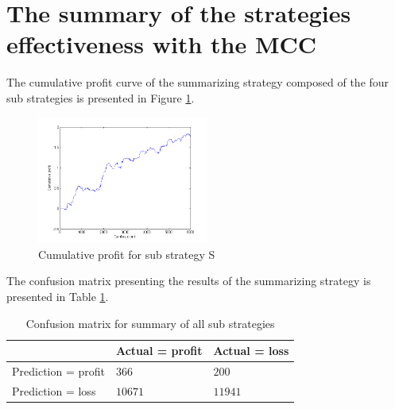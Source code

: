 \documentclass{jtacs}
\begin{document}
\section{The summary of the strategies effectiveness with the MCC}
The cumulative profit curve of the summarizing strategy composed of the four sub strategies is presented in Figure \ref{rys12}.
\begin{figure}[ht]
\centering
\includegraphics[width = 0.5\textwidth]{pictures/PivotPointsPodsumowanie.png}
\caption{Cumulative profit for sub strategy S}
\label{rys12}
\end{figure}
\FloatBarrier
The confusion matrix presenting the results of the summarizing strategy is presented in Table \ref{tab12}.
\begin{table}[ht]
\centering
\caption{Confusion matrix for summary of all sub strategies}
\label{tab12}
\begin{tabular}{|l|l|l|}\hline
&	Actual = profit	& Actual = loss\\ \hline
Prediction = profit & $366$	& $200$ \\ \hline
Prediction = loss &	$10671$ &	$11941$ \\ \hline
\end{tabular}
\end{table}
\FloatBarrier
\end{document}
